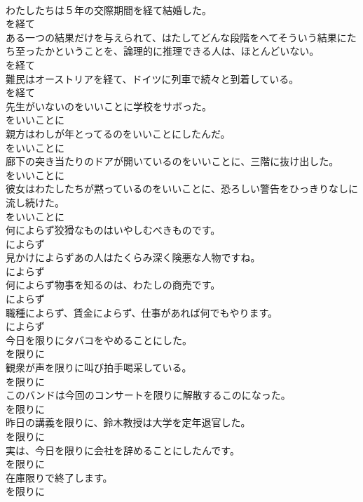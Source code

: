 \documentclass[8pt]{extreport}
\begin{document}
\begin{CJK}{UTF8}{min}
\\	わたしたちは５年の交際期間を経て結婚した。	
\\	を経て	
\\	ある一つの結果だけを与えられて、はたしてどんな段階をへてそういう結果にたち至ったかということを、論理的に推理できる人は、ほとんどいない。	
\\	を経て	
\\	難民はオーストリアを経て、ドイツに列車で続々と到着している。	
\\	を経て	
\\	先生がいないのをいいことに学校をサボった。	
\\	をいいことに	
\\	親方はわしが年とってるのをいいことにしたんだ。	
\\	をいいことに	
\\	廊下の突き当たりのドアが開いているのをいいことに、三階に抜け出した。	
\\	をいいことに	
\\	彼女はわたしたちが黙っているのをいいことに、恐ろしい警告をひっきりなしに流し続けた。	
\\	をいいことに	
\\	何によらず狡猾なものはいやしむべきものです。	
\\	によらず	
\\	見かけによらずあの人はたくらみ深く険悪な人物ですね。	
\\	によらず	
\\	何によらず物事を知るのは、わたしの商売です。	
\\	によらず	
\\	職種によらず、賃金によらず、仕事があれば何でもやります。	
\\	によらず	
\\	今日を限りにタバコをやめることにした。	
\\	を限りに	
\\	観衆が声を限りに叫び拍手喝采している。	
\\	を限りに	
\\	このバンドは今回のコンサートを限りに解散するこのになった。	
\\	を限りに	
\\	昨日の講義を限りに、鈴木教授は大学を定年退官した。	
\\	を限りに	
\\	実は、今日を限りに会社を辞めることにしたんです。	
\\	を限りに	
\\	在庫限りで終了します。	
\\	を限りに	

\end{CJK}
\end{document}

